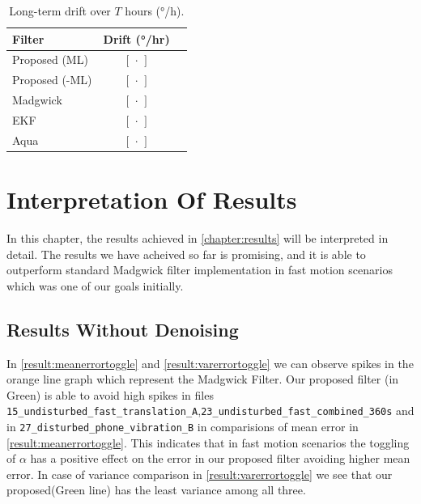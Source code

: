 \documentclass{iutbscthesis}
\begin{document}
\begin{table}[ht]
  \centering
  \caption{Long-term drift over \(T\) hours (°/h).}
  \label{tab:long_term_drift}
  \begin{tabular}{lcc}
    \toprule
    Filter & Drift (°/hr) \\
    \midrule
    Proposed (ML)     & \([\,\cdot\,]\) \\
    Proposed (-ML)    & \([\,\cdot\,]\) \\
    Madgwick           & \([\,\cdot\,]\) \\
    EKF                & \([\,\cdot\,]\) \\
    Aqua               & \([\,\cdot\,]\) \\
    \bottomrule
  \end{tabular}
\end{table}




\chapter{Interpretation Of Results} \label{chapter:discussion}

In this chapter, the results achieved in \autoref{chapter:results} will be interpreted in detail. The results we have acheived so far is promising, and it is able to outperform standard Madgwick filter implementation in fast motion scenarios which was one of our goals initially.

\section{Results Without Denoising}
In \autoref{result:meanerrortoggle} and \autoref{result:varerrortoggle} we can observe spikes in the orange line graph
which represent the Madgwick Filter. Our proposed filter (in Green) is able to avoid high spikes in files \texttt{15\_undisturbed\_fast\_translation\_A},\texttt{23\_undisturbed\_fast\_combined\_360s} and in \texttt{27\_disturbed\_phone\_vibration\_B} 
in comparisions of mean error in \autoref{result:meanerrortoggle}. This indicates that in fast motion scenarios the toggling of $\alpha$ 
has a positive effect on the error in our proposed filter avoiding higher mean error. In case of variance comparison
in \autoref{result:varerrortoggle} we see that our proposed(Green line) has the least variance among all three.
\end{document}
